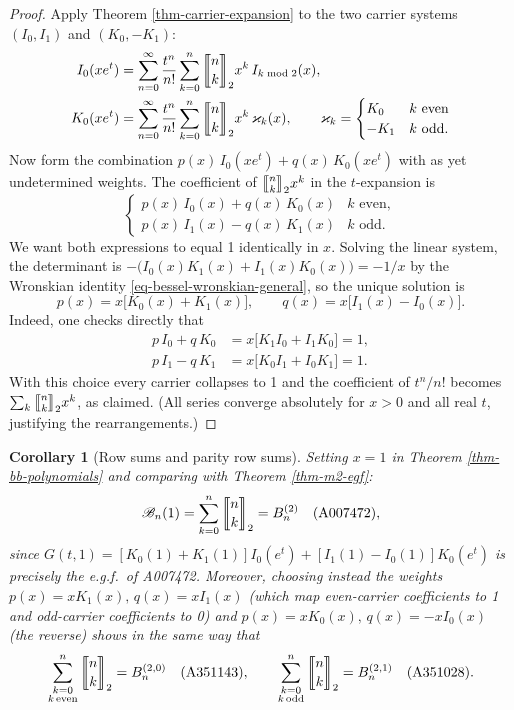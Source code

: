 \documentclass[a4paper]{amsart}
\numberwithin{equation}{section}
\newcommand{\mStirling}[0]{\genfrac{\llbracket}{\rrbracket}{0pt}{}}
\newtheorem{corollary}[theorem]{Corollary}
\begin{document}
\begin{proof}
Apply Theorem \ref{thm-carrier-expansion} to the two carrier systems $(I_0, I_1)$ and $(K_0, -K_1)$:
\[
\begin{aligned}
I_0(xe^t) &= \sum_{n=0}^\infty\frac{t^n}{n!}\sum_{k=0}^n \mStirling{n}{k}_2 x^k\, I_{k \bmod 2}(x), \\
K_0(xe^t) &= \sum_{n=0}^\infty\frac{t^n}{n!}\sum_{k=0}^n \mStirling{n}{k}_2 x^k\, \varkappa_k(x), \qquad \varkappa_k = \begin{cases} K_0 & k \text{ even}\\ -K_1 & k \text{ odd.}\end{cases}
\end{aligned}
\]
Now form the combination $p(x)\,I_0(xe^t) + q(x)\,K_0(xe^t)$ with as yet undetermined weights. The coefficient of $\mStirling{n}{k}_2 x^k$ in the $t$-expansion is
\[
\begin{cases}
p(x)\,I_0(x) + q(x)\,K_0(x) & k \text{ even},\\
p(x)\,I_1(x) - q(x)\,K_1(x) & k \text{ odd}.
\end{cases}
\]
We want both expressions to equal 1 identically in $x$. Solving the linear system, the determinant is $-\big(I_0(x)K_1(x) + I_1(x)K_0(x)\big) = -1/x$ by the Wronskian identity \eqref{eq-bessel-wronskian-general}, so the unique solution is
\[
p(x) = x\big[K_0(x) + K_1(x)\big], \qquad q(x) = x\big[I_1(x) - I_0(x)\big].
\]
Indeed, one checks directly that
\[
\begin{aligned}
p\,I_0 + q\,K_0 &= x\big[K_1 I_0 + I_1 K_0\big] = 1, \\
p\,I_1 - q\,K_1 &= x\big[K_0 I_1 + I_0 K_1\big] = 1.
\end{aligned}
\]
With this choice every carrier collapses to 1 and the coefficient of $t^n/n!$ becomes $\sum_k \mStirling{n}{k}_2 x^k$, as claimed. (All series converge absolutely for $x > 0$ and all real $t$, justifying the rearrangements.)
\end{proof}

\begin{corollary}[Row sums and parity row sums]\label{cor-2bell-rowsums}
Setting $x=1$ in Theorem \ref{thm-bb-polynomials} and comparing with Theorem \ref{thm-m2-egf}:
\[
\mathscr{B}_n(1) = \sum_{k=0}^{n}\mStirling{n}{k}_2 = B^{(2)}_n \quad (\textup{A007472}),
\]
since $G(t,1) = [K_0(1)+K_1(1)]I_0(e^t) + [I_1(1)-I_0(1)]K_0(e^t)$ is precisely the e.g.f.\ of A007472. Moreover, choosing instead the weights $p(x) = xK_1(x),\, q(x) = xI_1(x)$ (which map even-carrier coefficients to 1 and odd-carrier coefficients to 0) and $p(x) = xK_0(x),\, q(x) = -xI_0(x)$ (the reverse) shows in the same way that
\[
\sum_{\substack{k=0 \\ k \,\mathrm{even}}}^{n}\mStirling{n}{k}_2 = B^{(2,0)}_n \quad (\textup{A351143}), \qquad
\sum_{\substack{k=0 \\ k \,\mathrm{odd}}}^{n}\mStirling{n}{k}_2 = B^{(2,1)}_n \quad (\textup{A351028}).
\]
\end{corollary}
\end{document}
